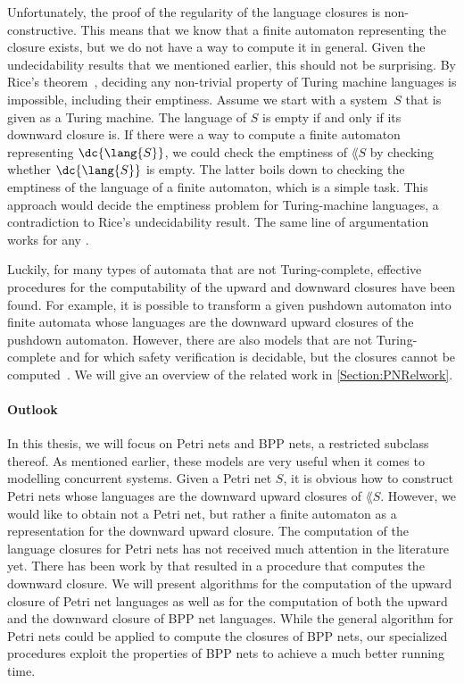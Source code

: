 \documentclass[../../diss.tex]{subfiles}
\begin{document}
Unfortunately, the proof of the regularity of the language closures is non-constructive.
This means that we know that a finite automaton representing the closure exists, but we do not have a way to compute it in general.
Given the undecidability results that we mentioned earlier, this should not be surprising.
By Rice's theorem~\cite{Rice53}, deciding any non-trivial property of Turing machine languages is impossible, including their emptiness.
Assume we start with a system~$S$ that is given as a Turing machine.
The language of $S$ is empty if and only if its downward closure is.
If there were a way to compute a finite automaton representing $\dc{\lang{S}}$, we could check the emptiness of $\lang{S}$ by checking whether $\dc{\lang{S}}$ is empty.
The latter boils down to checking the emptiness of the language of a finite automaton, which is a simple task.
This approach would decide the emptiness problem for Turing-machine languages, a contradiction to Rice's undecidability result.
The same line of argumentation works for any .

Luckily, for many types of automata that are not Turing-complete, effective procedures for the computability of the upward and downward closures have been found.
For example, it is possible to transform a given pushdown automaton into finite automata whose languages are the downward \resp upward closures of the pushdown automaton.
However, there are also models that are not Turing-complete and for which \eg safety verification is decidable, but the closures cannot be computed~\cite{Mayr03}.
We will give an overview of the related work in \cref{Section:PNRelwork}.

\paragraph{Outlook}

In this thesis, we will focus on Petri nets and BPP nets, a restricted subclass thereof.
As mentioned earlier, these models are very useful when it comes to modelling concurrent systems.
Given a Petri net $S$, it is obvious how to construct Petri nets whose languages are the downward \resp upward closures of $\lang{S}$.
However, we would like to obtain not a Petri net, but rather a finite automaton as a representation for the downward \resp upward closure.
The computation of the language closures for Petri nets has not received much attention in the literature yet.
There has been work by  that resulted in a procedure that computes the downward closure.
We will present algorithms for the computation of the upward closure of Petri net languages as well as for the computation of both the upward and the downward closure of BPP net languages.
While the general algorithm for Petri nets could be applied to compute the closures of BPP nets, our specialized procedures exploit the properties of BPP nets to achieve a much better running time.
\end{document}
